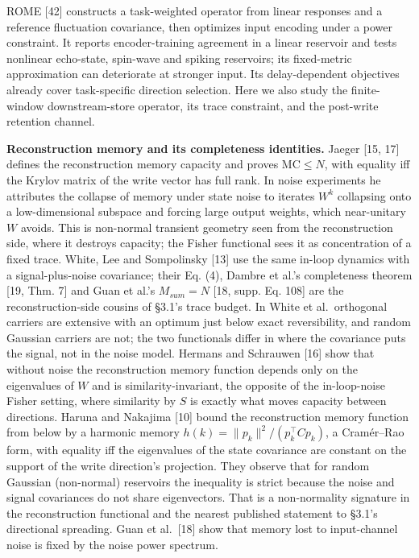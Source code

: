 \documentclass[
  10pt,
]{article}
\begin{document}
ROME {[}42{]} constructs a task-weighted operator from linear responses
and a reference fluctuation covariance, then optimizes input encoding
under a power constraint. It reports encoder-training agreement in a
linear reservoir and tests nonlinear echo-state, spin-wave and spiking
reservoirs; its fixed-metric approximation can deteriorate at stronger
input. Its delay-dependent objectives already cover task-specific
direction selection. Here we also study the finite-window
downstream-store operator, its trace constraint, and the post-write
retention channel.

\textbf{Reconstruction memory and its completeness identities.} Jaeger
{[}15, 17{]} defines the reconstruction memory capacity and proves
\(\mathrm{MC}\le N\), with equality iff the Krylov matrix of the write
vector has full rank. In noise experiments he attributes the collapse of
memory under state noise to iterates \(W^k\) collapsing onto a
low-dimensional subspace and forcing large output weights, which
near-unitary \(W\) avoids. This is non-normal transient geometry seen
from the reconstruction side, where it destroys capacity; the Fisher
functional sees it as concentration of a fixed trace. White, Lee and
Sompolinsky {[}13{]} use the same in-loop dynamics with a
signal-plus-noise covariance; their Eq. (4), Dambre et al.'s
completeness theorem {[}19, Thm. 7{]} and Guan et al.'s \(M_{sum}=N\)
{[}18, supp. Eq. 108{]} are the reconstruction-side cousins of §3.1's
trace budget. In White et al.~orthogonal carriers are extensive with an
optimum just below exact reversibility, and random Gaussian carriers are
not; the two functionals differ in where the covariance puts the signal,
not in the noise model. Hermans and Schrauwen {[}16{]} show that without
noise the reconstruction memory function depends only on the eigenvalues
of \(W\) and is similarity-invariant, the opposite of the in-loop-noise
Fisher setting, where similarity by \(S\) is exactly what moves capacity
between directions. Haruna and Nakajima {[}10{]} bound the
reconstruction memory function from below by a harmonic memory
\(h(k)=\|p_k\|^2/(p_k^\top Cp_k)\), a Cramér--Rao form, with equality
iff the eigenvalues of the state covariance are constant on the support
of the write direction's projection. They observe that for random
Gaussian (non-normal) reservoirs the inequality is strict because the
noise and signal covariances do not share eigenvectors. That is a
non-normality signature in the reconstruction functional and the nearest
published statement to §3.1's directional spreading. Guan et
al.~{[}18{]} show that memory lost to input-channel noise is fixed by
the noise power spectrum.
\end{document}
